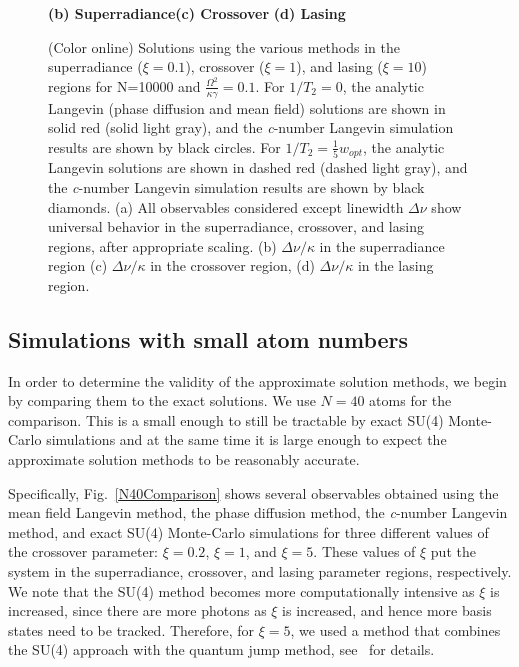 \documentclass[aps,
twocolumn,
showpacs,
superscriptaddress,groupedaddress]{revtex4}
\begin{document}
\begin{figure}
\begin{center}
	\hspace{-10mm}\textbf{(b) Superradiance}\hspace{33mm}\textbf{(c) Crossover}
  \hspace{37mm}\textbf{(d) Lasing}
\end{center}
		\vspace{-5mm}
\caption{(Color online) Solutions using the various methods in the
superradiance ($\xi=0.1$), crossover ($\xi=1$), and lasing ($\xi=10$)
regions for N=10000 and $\frac{\Omega^2}{\kappa \gamma}=0.1$. For
$1/T_2=0$, the analytic Langevin (phase diffusion and mean field)
solutions are shown in solid red (solid light gray), and the
{\it c}-number Langevin simulation results are shown by black circles.
For $1/T_2=\frac{1}{5} w_{opt}$, the analytic Langevin solutions are
shown in dashed red (dashed light gray), and the {\it
c}-number Langevin simulation results are shown by black diamonds. (a)
All observables considered except linewidth  $\Delta \nu$ show universal
behavior in the superradiance, crossover, and lasing regions, after
appropriate scaling.  (b)  $\Delta \nu / \kappa$ in the superradiance
region (c) $\Delta \nu / \kappa$ in the crossover region, (d) $\Delta
\nu / \kappa$ in the lasing region.}
 \label{N10000Comparison}
\end{figure}


\subsection{Simulations with small atom numbers}

In order to determine the validity of the approximate solution methods,
we begin by comparing them to the exact solutions.  We use $N=40$ atoms
for the comparison.  This is a small enough to still be tractable by
exact SU(4) Monte-Carlo simulations and at the same time it is large
enough to expect the approximate solution methods to be reasonably
accurate. 

Specifically, Fig.~\ref{N40Comparison} shows several observables
obtained using the mean field Langevin method, the phase diffusion
method, the {\it c}-number Langevin method, and exact SU(4) Monte-Carlo
simulations for three different values of the crossover parameter:
$\xi=0.2$, $\xi=1$, and $\xi=5$. These values of $\xi$ put the system in
the superradiance, crossover, and lasing parameter regions,
respectively.  We note that the SU(4) method becomes more
computationally intensive as $\xi$ is increased, since there are more
photons as $\xi$ is increased, and hence more basis states need to be
tracked. Therefore, for $\xi=5$, we used a method that combines the
SU(4) approach with the quantum jump method,
see~\cite{PhysRevA.87.062101} for details.
\end{document}
